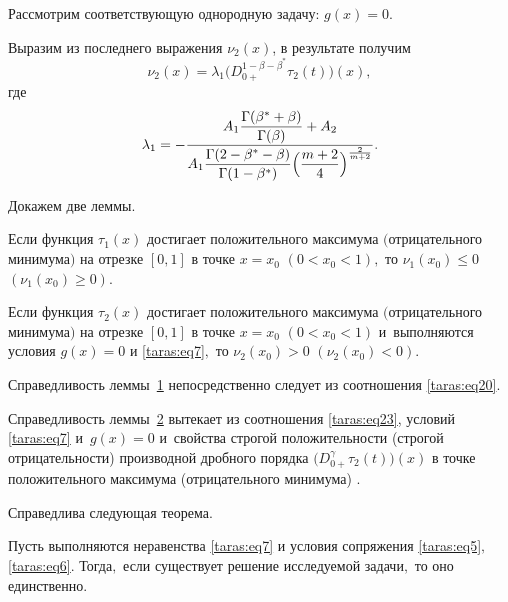 \pagebreak

Рассмотрим соответствующую однородную задачу: $g(x)=0$.

Выразим из последнего выражения $\nu_{2}(x)$, в результате получим
\begin{equation}
\label{taras:eq23}
\nu_{2}(x) = \lambda_{1} \bigl( D_{0+}^{ 1- \beta-\beta^{*}} \tau_{2}(t) \bigr)(x),
\end{equation}
где
\[
\lambda_{1}=
-\frac{ A_{1}\dfrac{\Gamma( \beta^{*}+ \beta)}{ \Gamma( \beta)} +A_{2}}{A_{1} \dfrac{ \Gamma(2- \beta^{*}- \beta)}{ \Gamma(1- \beta^{*})} \Bigl( \dfrac{m+2}{4} \Bigr)^{\frac{2}{m+2} }}.
\]

Докажем две леммы.

\hypertarget{taras:l1}{}

\smallskip

\begin{lemma}[1]Если функция $\tau_{1}(x)$ достигает положительного максимума $($отрицательного минимума$)$ на отрезке $[0,  1]$ в точке  $x=x_{0}$ $(0<x_{0}<1),$ то $\nu_{1}(x_{0}) \le0$ $(\nu_{1}(x_{0}) \ge0).$
\end{lemma}

\smallskip

\hypertarget{taras:l2}{}

\begin{lemma}[2]Если функция $\tau_{2}(x)$  достигает положительного максимума $($отрицательного минимума$)$ на отрезке $[0, 1]$ в точке  $x=x_{0}$ $(0<x_{0}<1)$ и~выполняются условия $g(x)=0$ и \eqref{taras:eq7}$,$ то $\nu_{2}(x_{0}) >0$ $(\nu_{2}(x_{0}) <0).$
\end{lemma}

\smallskip
Справедливость леммы~\hyperlink{taras:l1}{1} непосредственно следует из соотношения \eqref{taras:eq20}.

\smallskip

Справедливость леммы~\hyperlink{taras:l2}{2} вытекает из соотношения \eqref{taras:eq23}, условий \eqref{taras:eq7} \linebreak и~$g(x)=0$ и~свойства строгой положительности (строгой отрицательности) производной дробного порядка 
$\bigl( D_{0+}^{ \gamma} \tau_{2} (t) \bigr) (x)$ в точке положительного максимума (отрицательного минимума) 
\cite[с.~105]{taras:8}.



Справедлива следующая теорема.

\smallskip

\begin{theorem}[1]Пусть выполняются неравенства \eqref{taras:eq7} и условия сопряжения \eqref{taras:eq5}$,$ \eqref{taras:eq6}$.$ Тогда$,$ если существует решение исследуемой задачи$,$ то оно единственно$.$
\end{theorem}

